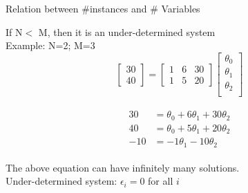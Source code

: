 \documentclass{beamer}
\begin{document}
%    
%    
%    
%    


%
%    



\begin{frame}{Relation between \#instances and \# Variables}
    
    If N$<$ M, then it is an under-determined system\\
   \pause  Example: N=2; M=3\\
 
   \pause $$ \begin{bmatrix}
        30 \\
        40 
    \end{bmatrix}
     = \begin{bmatrix}
         1 & 6& 30\\
         1 & 5& 20
     \end{bmatrix}    \begin{bmatrix}
        \theta_{0}\\
        \theta_{1}\\
        \theta_{2}\\
    \end{bmatrix} $$
 
    
    
  \pause   \begin{align}
\label{eqn*:eqlabel}
\begin{split}
   30 &= \theta_{0} + 6\theta_{1} + 30\theta_{2} \\
40 &= \theta_{0} + 5\theta_{1} + 20\theta_{2}\\
\hline
-10 &=  -1 \theta_{1} -10\theta_{2}
\end{split}
\end{align}

    
        
        
            
    
    
    
    The above equation can have infinitely many solutions. \\
    Under-determined system: $\epsilon_{i} = 0$ for all $i$

\end{frame}
\end{document}
